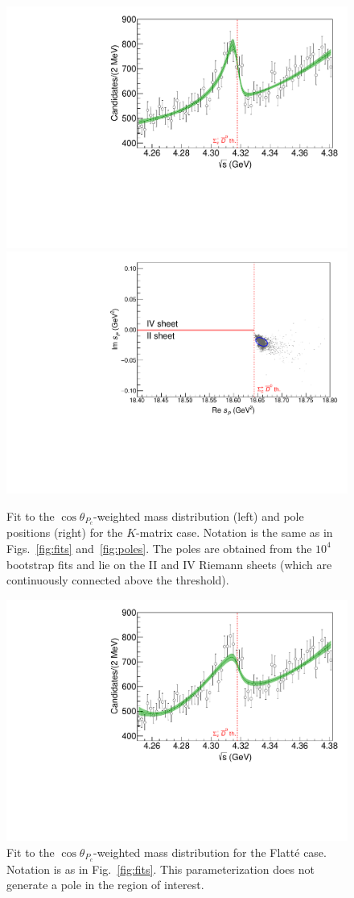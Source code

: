 \documentclass[aps,prl,
twocolumn,nofootinbib,
superscriptaddress,preprintnumbers]{revtex4-1}
\begin{document}
\begin{table}[h]
\begin{ruledtabular}
\begin{tabular}{c|cc|cc|cc}
\end{tabular}
\end{ruledtabular}
\end{table}

\begin{figure}[h]
\centering
\includegraphics[width=.49\textwidth]{plot_kmat.pdf}
\includegraphics[width=.49\textwidth]{general_kmat.pdf}
\caption{
Fit to the $\cos\theta_{P_c}$-weighted \jpsip mass distribution (left) and pole positions (right) for the $K$-matrix case.
Notation is the same as in Figs.~\ref{fig:fits} and~\ref{fig:poles}.
The poles are obtained from the $10^4$ bootstrap fits
and lie on the II and IV Riemann sheets
(which are continuously connected above the \SigmaD threshold).
} \label{fig:kmat}
\end{figure} 

\begin{figure}[h]
\centering
\includegraphics[width=.49\textwidth]{plot_flatte.pdf}
\caption{Fit to the $\cos\theta_{P_c}$-weighted \jpsip mass distribution for the Flatt\'e case.
Notation is as in Fig.~\ref{fig:fits}.
This parameterization does not generate a pole in the region of interest.
} \label{fig:flatte}
\end{figure} 
\end{document}
